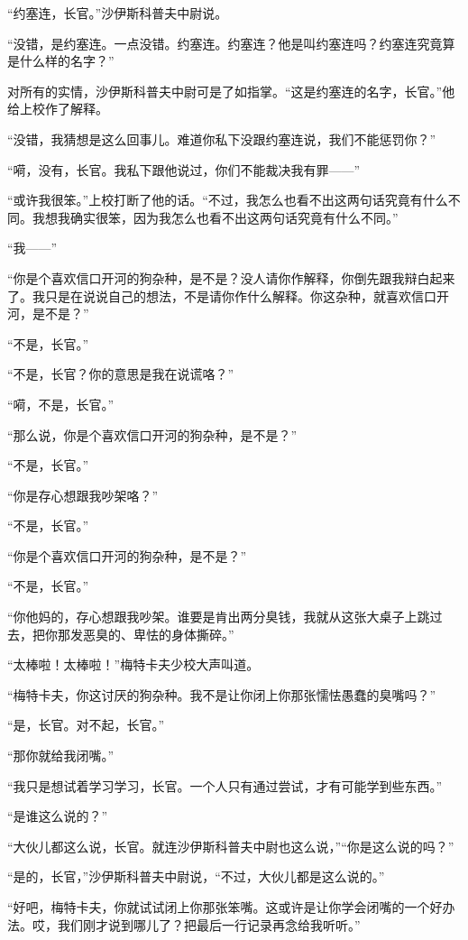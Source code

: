     “约塞连，长官。”沙伊斯科普夫中尉说。

    “没错，是约塞连。一点没错。约塞连。约塞连？他是叫约塞连吗？约塞连究竟算是什么样的名字？”

    对所有的实情，沙伊斯科普夫中尉可是了如指掌。“这是约塞连的名字，长官。”他给上校作了解释。

    “没错，我猜想是这么回事儿。难道你私下没跟约塞连说，我们不能惩罚你？”

    “嗬，没有，长官。我私下跟他说过，你们不能裁决我有罪——”

    “或许我很笨。”上校打断了他的话。“不过，我怎么也看不出这两句话究竟有什么不同。我想我确实很笨，因为我怎么也看不出这两句话究竟有什么不同。”

    “我——”

    “你是个喜欢信口开河的狗杂种，是不是？没人请你作解释，你倒先跟我辩白起来了。我只是在说说自己的想法，不是请你作什么解释。你这杂种，就喜欢信口开河，是不是？”

    “不是，长官。”

    “不是，长官？你的意思是我在说谎咯？”

    “嗬，不是，长官。”

    “那么说，你是个喜欢信口开河的狗杂种，是不是？”

    “不是，长官。”

    “你是存心想跟我吵架咯？”

    “不是，长官。”

    “你是个喜欢信口开河的狗杂种，是不是？”

    “不是，长官。”

    “你他妈的，存心想跟我吵架。谁要是肯出两分臭钱，我就从这张大桌子上跳过去，把你那发恶臭的、卑怯的身体撕碎。”

    “太棒啦！太棒啦！”梅特卡夫少校大声叫道。

    “梅特卡夫，你这讨厌的狗杂种。我不是让你闭上你那张懦怯愚蠢的臭嘴吗？”

    “是，长官。对不起，长官。”

    “那你就给我闭嘴。”

    “我只是想试着学习学习，长官。一个人只有通过尝试，才有可能学到些东西。”

    “是谁这么说的？”

    “大伙儿都这么说，长官。就连沙伊斯科普夫中尉也这么说，”“你是这么说的吗？”

    “是的，长官，”沙伊斯科普夫中尉说，“不过，大伙儿都是这么说的。”

    “好吧，梅特卡夫，你就试试闭上你那张笨嘴。这或许是让你学会闭嘴的一个好办法。哎，我们刚才说到哪儿了？把最后一行记录再念给我听听。”

